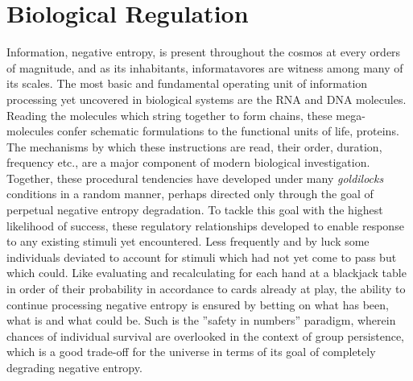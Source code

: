 \section{Biological Regulation}
\label{sec:bioreg}
Information, \ie negative entropy, is present throughout the cosmos at every orders of magnitude, and as its inhabitants, informatavores are witness among many of its scales. The most basic and fundamental operating unit of information processing yet uncovered in biological systems are the RNA and DNA molecules. Reading the molecules which string together to form chains, these mega-molecules confer schematic formulations to the functional units of life, proteins. The mechanisms by which these instructions are read, \ie their order, duration, frequency etc., are a major component of modern biological investigation. Together, these procedural tendencies have developed under many \emph{goldilocks} conditions in a random manner, perhaps directed only through the goal of perpetual negative entropy degradation. To tackle this goal with the highest likelihood of success, these regulatory relationships developed to enable response to any existing stimuli yet encountered. Less frequently and by luck some individuals deviated to account for stimuli which had not yet come to pass but which could. Like evaluating and recalculating for each hand at a blackjack table in order of their probability in accordance to cards already at play, the ability to continue processing negative entropy is ensured by betting on what has been, what is and what could be. Such is the ''safety in numbers'' paradigm, wherein chances of individual survival are overlooked in the context of group persistence, which is a good trade-off for the universe in terms of its goal of completely degrading negative entropy.


